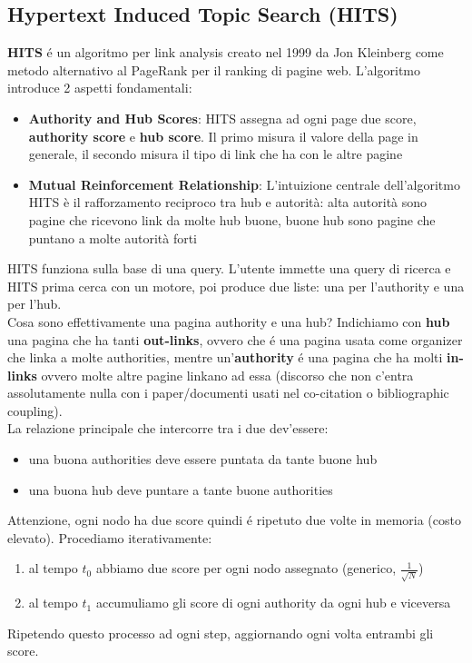 \subsection{Hypertext Induced Topic Search (HITS)}
\textbf{HITS} é un algoritmo per link analysis creato nel 1999 da Jon Kleinberg come metodo alternativo al PageRank per il ranking di pagine web. L'algoritmo introduce 2 aspetti fondamentali:
\begin{itemize}
    \item \textbf{Authority and Hub Scores}: HITS assegna ad ogni page due score, \textbf{authority score} e \textbf{hub score}. Il primo misura il valore della page in generale, il secondo misura il tipo di link che ha con le altre pagine
    \item \textbf{Mutual Reinforcement Relationship}: L'intuizione centrale dell'algoritmo HITS è il rafforzamento reciproco tra hub e autorità: alta autorità sono pagine che ricevono link da molte hub buone, buone hub sono pagine che puntano a molte autorità forti
\end{itemize}
HITS funziona sulla base di una query. L'utente immette una query di ricerca e HITS prima cerca con un motore, poi produce due liste: una per l'authority e una per l'hub. 
\\
Cosa sono effettivamente una pagina authority e una hub? Indichiamo con \textbf{hub} una pagina che ha tanti \textbf{out-links}, ovvero che é una pagina usata come organizer che linka a molte authorities, mentre un'\textbf{authority} é una pagina che ha molti \textbf{in-links} ovvero molte altre pagine linkano ad essa (discorso che non c'entra assolutamente nulla con i paper/documenti usati nel co-citation o bibliographic coupling).
\\
La relazione principale che intercorre tra i due dev'essere:
\begin{itemize}
    \item una buona authorities deve essere puntata da tante buone hub
    \item una buona hub deve puntare a tante buone authorities
\end{itemize}
Attenzione, ogni nodo ha due score quindi é ripetuto due volte in memoria (costo elevato). Procediamo iterativamente: 
\begin{enumerate}
    \item al tempo $t_0$ abbiamo due score per ogni nodo assegnato (generico, $\frac{1}{\sqrt{N}}$)
    \item al tempo $t_1$ accumuliamo gli score di ogni authority da ogni hub e viceversa
\end{enumerate}
Ripetendo questo processo ad ogni step, aggiornando ogni volta entrambi gli score.
